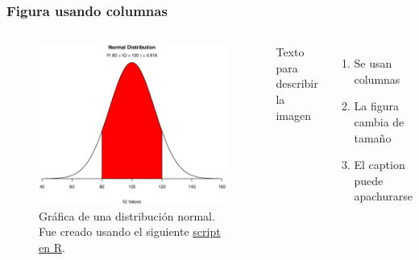 \documentclass{beamer}
\begin{document}
\begin{frame}
\frametitle{Figura usando columnas}
\begin{columns}
 \begin{figure}[htb]
  \centering
  \includegraphics[width=\textwidth]{img/normal}
\caption{Gráfica de una distribución normal. Fue creado usando el siguiente \href{https://www.statmethods.net/advgraphs/probability.html}{script en R}.}
\end{figure}    
     Texto para describir la imagen
     \begin{enumerate}
         \item Se usan columnas
         \item La figura cambia de tamaño
         \item El caption puede apachurarse
     \end{enumerate}
\end{columns}
\end{frame}
\end{document}
